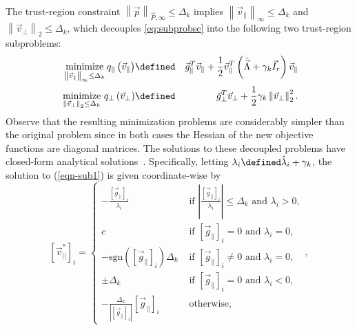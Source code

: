{\begin{align*}
\end{align*}
The trust-region constraint 
$\left\| \vec{p} \right\|_{\vec{P},\infty} \le \Delta_k $ implies $ \left\|
  \vec{v}_{\parallel} \right\|_{\infty} \le \Delta_k $ and $ \left\|
  \vec{v}_{\perp} \right\|_{2} \le \Delta_k$, which decouples
\eqref{eq:subprobsc} into the following two trust-region subproblems:
\begin{eqnarray}
  \underset{ \left\| \vec{v}_{\parallel} \right\|_{\infty} \le \Delta_k }{\text{ minimize }} q_{\parallel}\left(\vec{v}_{\parallel}\right) & \defined & \vec{g}^T_{\parallel} \vec{v}_{\parallel} + \frac{1}{2} \vec{v}^T_{\parallel} \left(  \hat{\vec{\Lambda}} + \gamma_k \vec{I}_r \right) \vec{v}_{\parallel} \label{eqn-sub1} \\
	\underset{ \left\| \vec{v}_{\perp} \right\|_{2} \le \Delta_k }{\text{ minimize }} q_{\perp}\left(\vec{v}_{\perp}\right) &\defined& \vec{g}^T_{\perp} \vec{v}_{\perp} + 
	\frac{1}{2}\gamma_k\left\| \vec{v}_{\perp} \right\|^2_2. \label{eqn-sub2}
\end{eqnarray}
Observe that the resulting minimization problems are considerably simpler
than the original problem since in both cases the Hessian of the new
objective functions are diagonal matrices.  The solutions to
these decoupled problems have closed-form analytical solutions~\cite{BurdakovLMTR16,BruEM16}. Specifically, letting 
$ \lambda_i \defined \hat{\lambda}_{i} +
\gamma_k$, the solution to (\ref{eqn-sub1}) is given coordinate-wise by 
\begin{equation}\label{eqn:solution_vparallel}
		[\vec{v}^*_{||} ]_i =
		\begin{cases}
		-\frac{\left[ \vec{g}_{||}\right]_i}{ \lambda_i} 
			& \text{ if } \left| \frac{ \left[ \vec{g}_{||}\right]_i  }{\lambda_i} \right| \le \Delta_k \text{ and }  \lambda_i > 0, \\
		 c & \text{ if } \left[ \vec{g}_{\parallel}\right]_i = 0 \text{ and }  \lambda_i = 0,\\
		- \text{sgn}(\left [ \vec{g}_{\parallel} \right ]_i) \Delta_k											
		& \text{ if } \left[ \vec{g}_{\parallel}\right]_i \ne 0 \text{ and }  \lambda_i = 0,\\				
		\pm\Delta_k 											
		& \text{ if } \left[ \vec{g}_{\parallel}\right]_i = 0 \text{ and }  \lambda_i < 0,\\
		-\frac{\Delta_k}{ \left| \left[ \vec{g}_{||}\right]_i \right|} \left[ \vec{g}_{||}\right]_i 
		& \text{ otherwise},
		\end{cases}, 
\end{equation}
}
